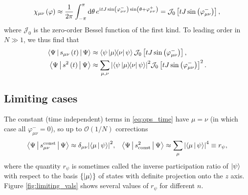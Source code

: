 \documentclass[nofootinbib,notitlepage,11pt]{revtex4-2}
\renewcommand{\t}{\text} %
\newcommand{\f}[2]{\dfrac{#1}{#2}} %
\newcommand{\p}[1]{\left(#1\right)} %
\renewcommand{\sp}[1]{\left[#1\right]} %
\renewcommand{\set}[1]{\left\{#1\right\}} %
\newcommand{\bk}{\Braket} %
\renewcommand{\dd}{\text{d}} %
\renewcommand{\i}{\mathrm{i}\mkern1mu} %
\newcommand{\1}{\mathds{1}}
\newcommand{\J}{\mathcal{J}}
\renewcommand{\O}{\mathcal{O}}
\begin{document}
\begin{align}
  \chi_{\mu\nu}\p{\varphi} \approx \f1{2\pi} \int_{-\pi}^\pi \dd\theta\,
  e^{\i tJ\sin\p{\varphi_{\mu\nu}^-} \sin\p{\theta+\varphi_{\mu\nu}^+}}
  = \J_0\sp{tJ\sin\p{\varphi_{\mu\nu}^-}},
\end{align}
where $\J_0$ is the zero-order Bessel function of the first kind.
To leading order in $N\gg1$, we thus find that
\begin{align}
  \bk{\Psi|s_{\mu\nu}\p{t}|\Psi}
  &\approx \bk{\psi\op{\mu}{\nu}\psi}
  \J_0\sp{tJ\sin\p{\varphi_{\mu\nu}^-}},
  \\
  \bk{\Psi|s^2\p{t}|\Psi}
  &\approx \sum_{\mu,\nu} \abs{\bk{\psi\op{\mu}{\nu}\psi}}^2
  \J_0\sp{tJ\sin\p{\varphi_{\mu\nu}^-}}^2.
  \label{eq:ops_time}
\end{align}

\subsection{Limiting cases}

The constant (time independent) terms in \eqref{eq:ops_time} have $\mu=\nu$ (in which case all $\varphi_{\mu\nu}^-=0$), so up to $\O(1/N)$ corrections
\begin{align}
  \bk{\Psi|s_{\mu\nu}^{\t{const}}|\Psi}
  \approx \delta_{\mu\nu} \abs{\bk{\mu|\psi}}^2,
  &&
  \bk{\Psi|s^2_{\t{const}}|\Psi}
  \approx \sum_\mu \abs{\bk{\mu|\psi}}^4 \equiv r_\psi,
  \label{eq:ops_const}
\end{align}
where the quantity $r_\psi$ is sometimes called the inverse participation ratio of $\ket\psi$ with respect to the basis $\set{\ket\mu}$ of states with definite projection onto the $z$ axis.
Figure \ref{fig:limiting_vals} shows several values of $r_\psi$ for different $n$.
\end{document}
